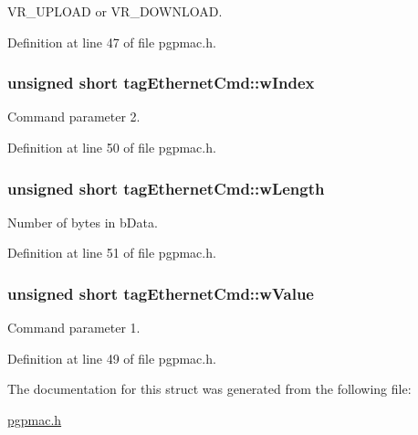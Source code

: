 V\-R\-\_\-\-U\-P\-L\-O\-A\-D or V\-R\-\_\-\-D\-O\-W\-N\-L\-O\-A\-D. 



Definition at line 47 of file pgpmac.\-h.

\hypertarget{structtagEthernetCmd_a92f5a374e87d4f496b64b4888850d6e6}{
\subsubsection[{w\-Index}]{\setlength{\rightskip}{0pt plus 5cm}unsigned short tag\-Ethernet\-Cmd\-::w\-Index}}\label{structtagEthernetCmd_a92f5a374e87d4f496b64b4888850d6e6}


Command parameter 2. 



Definition at line 50 of file pgpmac.\-h.

\hypertarget{structtagEthernetCmd_af5df25ff13ca30fa33719d0df1ab7e97}{
\subsubsection[{w\-Length}]{\setlength{\rightskip}{0pt plus 5cm}unsigned short tag\-Ethernet\-Cmd\-::w\-Length}}\label{structtagEthernetCmd_af5df25ff13ca30fa33719d0df1ab7e97}


Number of bytes in b\-Data. 



Definition at line 51 of file pgpmac.\-h.

\hypertarget{structtagEthernetCmd_aec0ee9a5f6c7e3bc6e4bd98f1bd52783}{
\subsubsection[{w\-Value}]{\setlength{\rightskip}{0pt plus 5cm}unsigned short tag\-Ethernet\-Cmd\-::w\-Value}}\label{structtagEthernetCmd_aec0ee9a5f6c7e3bc6e4bd98f1bd52783}


Command parameter 1. 



Definition at line 49 of file pgpmac.\-h.



The documentation for this struct was generated from the following file\-:\begin{DoxyCompactItemize}
\item 
\hyperlink{pgpmac_8h}{pgpmac.\-h}\end{DoxyCompactItemize}
